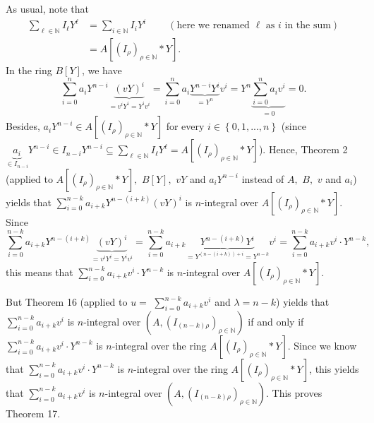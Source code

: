 \documentclass[12pt,final,notitlepage,onecolumn]{article}%
\begin{document}
As usual, note that%
\begin{align*}
\sum\limits_{\ell\in\mathbb{N}}I_{\ell}Y^{\ell}  &  =\sum\limits_{i\in
\mathbb{N}}I_{i}Y^{i}\ \ \ \ \ \ \ \ \ \ \left(  \text{here we renamed }%
\ell\text{ as }i\text{ in the sum}\right) \\
&  =A\left[  \left(  I_{\rho}\right)  _{\rho\in\mathbb{N}}\ast Y\right]  .
\end{align*}
In the ring $B\left[  Y\right]  $, we have%
\[
\sum_{i=0}^{n}a_{i}Y^{n-i}\underbrace{\left(  vY\right)  ^{i}}_{=v^{i}%
Y^{i}=Y^{i}v^{i}}=\sum_{i=0}^{n}a_{i}\underbrace{Y^{n-i}Y^{i}}_{=Y^{n}}%
v^{i}=Y^{n}\underbrace{\sum_{i=0}^{n}a_{i}v^{i}}_{=0}=0.
\]
Besides, $a_{i}Y^{n-i}\in A\left[  \left(  I_{\rho}\right)  _{\rho
\in\mathbb{N}}\ast Y\right]  $ for every $i\in\left\{  0,1,...,n\right\}  $
(since $\underbrace{a_{i}}_{\in I_{n-i}}Y^{n-i}\in I_{n-i}Y^{n-i}\subseteq
\sum\limits_{\ell\in\mathbb{N}}I_{\ell}Y^{\ell}=A\left[  \left(  I_{\rho
}\right)  _{\rho\in\mathbb{N}}\ast Y\right]  $). Hence, Theorem 2 (applied to
$A\left[  \left(  I_{\rho}\right)  _{\rho\in\mathbb{N}}\ast Y\right]  ,$
$B\left[  Y\right]  ,$ $vY$ and $a_{i}Y^{n-i}$ instead of $A,$ $B,$ $v$ and
$a_{i}$) yields that $\sum\limits_{i=0}^{n-k}a_{i+k}Y^{n-\left(  i+k\right)
}\left(  vY\right)  ^{i}$ is $n$-integral over $A\left[  \left(  I_{\rho
}\right)  _{\rho\in\mathbb{N}}\ast Y\right]  $. Since%
\[
\sum\limits_{i=0}^{n-k}a_{i+k}Y^{n-\left(  i+k\right)  }\underbrace{\left(
vY\right)  ^{i}}_{=v^{i}Y^{i}=Y^{i}v^{i}}=\sum\limits_{i=0}^{n-k}%
a_{i+k}\underbrace{Y^{n-\left(  i+k\right)  }Y^{i}}_{=Y^{\left(  n-\left(
i+k\right)  \right)  +i}=Y^{n-k}}v^{i}=\sum\limits_{i=0}^{n-k}a_{i+k}%
v^{i}\cdot Y^{n-k},
\]
this means that $\sum\limits_{i=0}^{n-k}a_{i+k}v^{i}\cdot Y^{n-k}$ is
$n$-integral over $A\left[  \left(  I_{\rho}\right)  _{\rho\in\mathbb{N}}\ast
Y\right]  $.

But Theorem 16 (applied to $u=$ $\sum\limits_{i=0}^{n-k}a_{i+k}v^{i}$ and
$\lambda=n-k$) yields that $\sum\limits_{i=0}^{n-k}a_{i+k}v^{i}$ is
$n$-integral over $\left(  A,\left(  I_{\left(  n-k\right)  \rho}\right)
_{\rho\in\mathbb{N}}\right)  $ if and only if $\sum\limits_{i=0}^{n-k}%
a_{i+k}v^{i}\cdot Y^{n-k}$ is $n$-integral over the ring $A\left[  \left(
I_{\rho}\right)  _{\rho\in\mathbb{N}}\ast Y\right]  $. Since we know that
$\sum\limits_{i=0}^{n-k}a_{i+k}v^{i}\cdot Y^{n-k}$ is $n$-integral over the
ring $A\left[  \left(  I_{\rho}\right)  _{\rho\in\mathbb{N}}\ast Y\right]  $,
this yields that $\sum\limits_{i=0}^{n-k}a_{i+k}v^{i}$ is $n$-integral over
$\left(  A,\left(  I_{\left(  n-k\right)  \rho}\right)  _{\rho\in\mathbb{N}%
}\right)  $. This proves Theorem 17.
\end{document}
